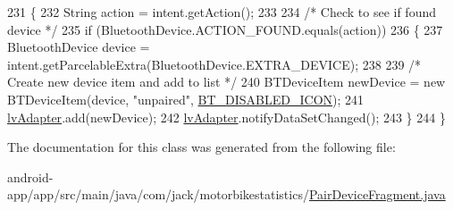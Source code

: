 \begin{DoxyCode}
231                                                               \{
232             String action = intent.getAction();
233 
234             \textcolor{comment}{/* Check to see if found device */}
235             \textcolor{keywordflow}{if} (BluetoothDevice.ACTION\_FOUND.equals(action))
236             \{
237                 BluetoothDevice device = intent.getParcelableExtra(BluetoothDevice.EXTRA\_DEVICE);
238 
239                 \textcolor{comment}{/* Create new device item and add to list */}
240                 BTDeviceItem newDevice = \textcolor{keyword}{new} BTDeviceItem(device, \textcolor{stringliteral}{"unpaired"}, 
      \hyperlink{classcom_1_1jack_1_1motorbikestatistics_1_1_pair_device_fragment_a27b366d93919d4f48ab58834ce40b117}{BT\_DISABLED\_ICON});
241                 \hyperlink{classcom_1_1jack_1_1motorbikestatistics_1_1_pair_device_fragment_a5ab5efcda2c2fe8db4420ec28ea2840f}{lvAdapter}.add(newDevice);
242                 \hyperlink{classcom_1_1jack_1_1motorbikestatistics_1_1_pair_device_fragment_a5ab5efcda2c2fe8db4420ec28ea2840f}{lvAdapter}.notifyDataSetChanged();
243             \}
244         \}
\end{DoxyCode}


The documentation for this class was generated from the following file\+:\begin{DoxyCompactItemize}
\item 
android-\/app/app/src/main/java/com/jack/motorbikestatistics/\hyperlink{_pair_device_fragment_8java}{Pair\+Device\+Fragment.\+java}\end{DoxyCompactItemize}

